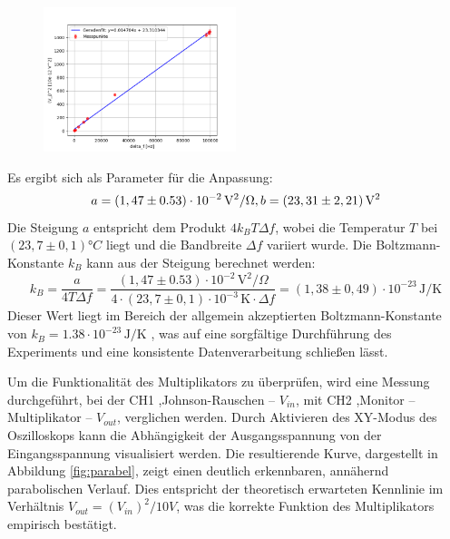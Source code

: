\begin{figure}[htbp]
    \centering
    \includegraphics[width=0.5\textwidth]{figs/johnson_bandwith.png}
    \caption{}
    \label{fig:fit2}
\end{figure}
\FloatBarrier
Es ergibt sich als Parameter für die Anpassung:
\begin{equation}
a = (1,47 \pm 0.53) \cdot 10^{-2} \, \mathrm{V}^2/\Omega,   \\
b = (23,31 \pm 2,21) \, \mathrm{V}^2
\end{equation}
Die Steigung $a$ entspricht dem Produkt $4 k_B T \Delta f$, wobei die Temperatur $T$ bei $(23,7 \pm 0,1) °C$ liegt und die Bandbreite $\Delta f$ variiert wurde. Die Boltzmann-Konstante $k_B$ kann aus der Steigung berechnet werden:
\begin{equation}
k_B = \frac{a}{4 T \Delta f} = \frac{(1,47 \pm 0.53) \cdot 10^{-2} \,\mathrm{V}^2/\Omega}{4 \cdot (23,7 \pm 0,1) \cdot 10^{-3} \,\mathrm{K} \cdot \Delta f} = (1,38 \pm 0,49) \cdot 10^{-23} \,\mathrm{J/K}
\end{equation}
Dieser Wert liegt im Bereich der allgemein akzeptierten Boltzmann-Konstante von $k_B = 1.38 \cdot 10^{-23} \,\mathrm{J/K}$ \cite{boltzmann} %
, was auf eine sorgfältige Durchführung des Experiments und eine konsistente Datenverarbeitung schließen lässt.



Um die Funktionalität des Multiplikators zu überprüfen, wird eine Messung durchgeführt, bei der CH1 ,Johnson-Rauschen – $V_{in}$, mit CH2 ,Monitor – Multiplikator – $V_{out}$, verglichen werden. Durch Aktivieren des XY-Modus des Oszilloskops kann die Abhängigkeit der Ausgangsspannung von der Eingangsspannung visualisiert werden. Die resultierende Kurve, dargestellt in Abbildung \ref{fig:parabel}, zeigt einen deutlich erkennbaren, annähernd parabolischen Verlauf. Dies entspricht der theoretisch erwarteten Kennlinie im Verhältnis $V_{out} = (V_{in})^2 / 10 V$, was die korrekte Funktion des Multiplikators empirisch bestätigt. 

